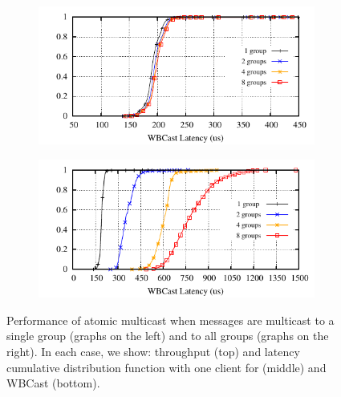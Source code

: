 \begin{figure}[ht]
  \begin{subfigure}{\columnwidth}
    \centering
    \includegraphics[width=0.95\columnwidth]{figures/benchmark/graphs/figure-genuine-compare-latency-cdf-wbcast}
  \end{subfigure}
  \begin{subfigure}{\columnwidth}
    \centering
    \includegraphics[width=0.95\columnwidth]{figures/benchmark/graphs/figure-multi-dest-compare-latency-cdf-WBCast}
  \end{subfigure}
  \caption{Performance of atomic multicast when messages are multicast to a single group (graphs on the left) and to all groups (graphs on the right). In each case, we show: throughput (top) and latency cumulative distribution function with one client for \libname (middle) and WBCast (bottom).}
  \label{fig:multicast-single-multi-group}
\end{figure}

